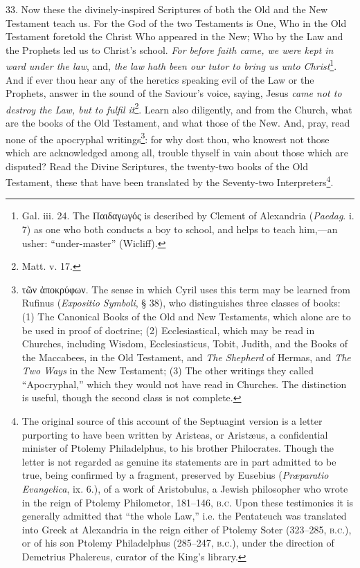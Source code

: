 33. Now these the divinely-inspired Scriptures of both the Old and the New Testament teach us. For the God of the two Testaments is One, Who in the Old Testament foretold the Christ Who appeared in the New; Who by the Law and the Prophets led us to Christ’s school.\emph{ For before faith came, we were kept in ward under the law}, and, \emph{the law hath been our tutor to bring us unto Christ}\footnote{Gal. iii. 24. The \textgreek{Παιδαγωγός} is described by Clement of Alexandria (\emph{Paedag}. i. 7) as one who both conducts a boy to school, and helps to teach him,—an usher: “under-master” (Wicliff).}. And if ever thou hear any of the heretics speaking evil of the Law or the Prophets, answer in the sound of the Saviour’s voice, saying, Jesus \emph{came not to destroy the Law, but to fulfil it}\footnote{Matt. v. 17.}. Learn also diligently, and from the Church, what are the books of the Old Testament, and what those of the New. And, pray, read none of the apocryphal writings\footnote{\textgreek{τῶν ἀποκρύφων}. The sense in which Cyril uses this term may be learned from Rufinus (\emph{Expositio Symboli}, § 38), who distinguishes three classes of books: (1) The Canonical Books of the Old and New Testaments, which alone are to be used in proof of doctrine; (2) Ecclesiastical, which may be read in Churches, including Wisdom, Ecclesiasticus, Tobit, Judith, and the Books of the Maccabees, in the Old Testament, and \emph{The Shepherd} of Hermas, and \emph{The Two Ways} in the New Testament; (3) The other writings they called “Apocryphal,” which they would not have read in Churches. The distinction is useful, though the second class is not complete.}: for why dost thou, who knowest not those which are acknowledged among all, trouble thyself in vain about those which are disputed? Read the Divine Scriptures, the twenty-two books of the Old Testament, these that have been translated by the Seventy-two Interpreters\footnote{The original source of this account of the Septuagint version is a letter purporting to have been written by Aristeas, or Aristæus, a confidential minister of Ptolemy Philadelphus, to his brother Philocrates. Though the letter is not regarded as genuine its statements are in part admitted to be true, being confirmed by a fragment, preserved by Eusebius (\emph{Præparatio Evangelica}, ix. 6.), of a work of Aristobulus, a Jewish philosopher who wrote in the reign of Ptolemy Philometor, 181–146, \textsc{b.c.} Upon these testimonies it is generally admitted that “the whole Law,” i.e. the Pentateuch was translated into Greek at Alexandria in the reign either of Ptolemy Soter (323–285, \textsc{b.c.}), or of his son Ptolemy Philadelphus (285–247, \textsc{b.c.}), under the direction of Demetrius Phalereus, curator of the King’s library.}.

